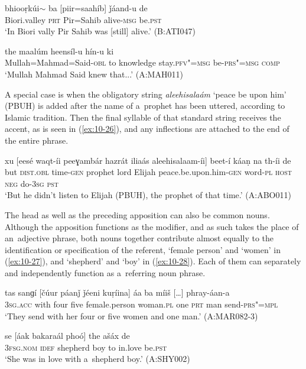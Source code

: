 \begin{exe}
\ex
\label{ex:10-24}
\gll bhiooṛkúi$\sim$ ba [piir=saahíb] ǰáand-u de \\
Biori.valley \textsc{prt} Pir=Sahib alive-\textsc{msg} be.\textsc{pst} \\
\glt `In Biori vally Pir Sahib was [still] alive.' (B:ATI047)

\ex
\label{ex:10-25}
\gll [mulaa=mhaamad=seed-á] the maalúm heensíl-u hín-u ki \\
Mullah=Mahmad=Said-\textsc{obl} to knowledge stay.\textsc{pfv"=msg} be-\textsc{prs"=msg} \textsc{comp} \\
\glt `Mullah Mahmad Said knew that...' (A:MAH011)
\end{exe}

A special case is when the obligatory string \textit{aleehisalaám} `peace be upon him' (PBUH) is added after the name of a~prophet has been uttered, according to Islamic tradition. Then the final syllable of that standard string receives the accent, as is seen in (\ref{ex:10-26}), and any inflections are attached to the end of the entire phrase.

\begin{exe}
\ex
\label{ex:10-26}
\gll xu [eesé waqt-íi peeɣambár hazrát iliaás aleehisalaam-íi] beet-í káaṇ na th-íi de \\
but \textsc{dist.obl} time-\textsc{gen} prophet lord  Elijah peace.be.upon.him-\textsc{gen} 
word-\textsc{pl} \textsc{host} \textsc{neg} do-\textsc{3sg} \textsc{pst} \\
\glt `But he didn't listen to Elijah (PBUH), the prophet of that time.' (A:ABO011)
\end{exe}

The head as well as the preceding apposition can also be common nouns. Although the apposition functions as the modifier, and as such takes the place of an~adjective phrase, both nouns together contribute almost equally to the identification or specification of the referent, `female person' and `women' in (\ref{ex:10-27}), and `shepherd' and `boy' in (\ref{ex:10-28}). Each of them can separately and independently function as a~referring noun phrase. 

\begin{exe}
\ex
\label{ex:10-27}
\gll tas sanɡí [čúur páanǰ ǰéeni kuṛíina] áa ba míiš [{\ldots}] phray-áan-a \\
\textsc{3sg.acc} with four five female.person woman.\textsc{pl}  one \textsc{prt} man {} send-\textsc{prs"=mpl} \\
\glt `They send with her four or five women and one man.' (A:MAR082-3)

\ex
\label{ex:10-28}
\gll se [áak bakaraál phoó] the ašáx de  \\
\textsc{3fsg.nom} \textsc{idef} shepherd boy to in.love be.\textsc{pst}  \\
\glt `She was in love with a~shepherd boy.' (A:SHY002)
\end{exe}

